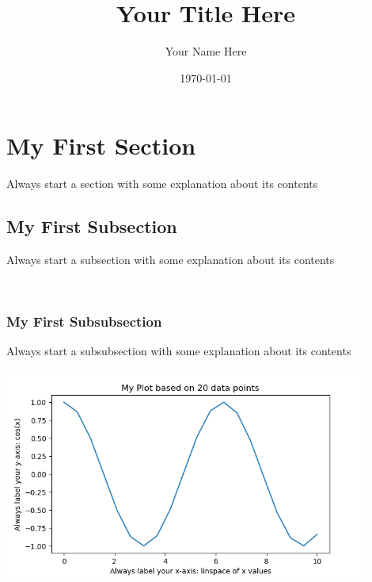 \documentclass[10pt]{extarticle}\usepackage[letterpaper]{geometry}
\author{Your Name Here} %
\date{\today}
\title{Your Title Here}
\begin{document}
\maketitle
\tableofcontents\section{ My First Section }

Always start a section with some explanation about its contents

\subsection{ My First Subsection }

Always start a subsection with some explanation about its contents

\ 
 \subsubsection{ My First Subsubsection }

Always start a subsubsection with some explanation about its contents

\includegraphics[width=0.9\textwidth]{img/My_Plot.png}
\end{document}
